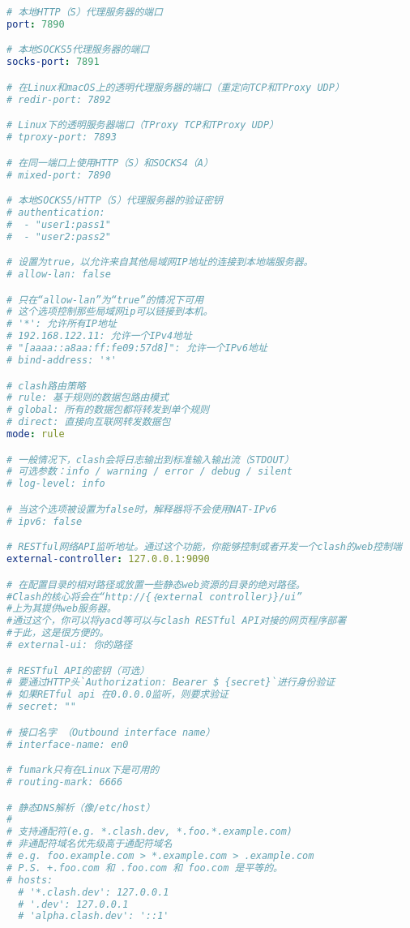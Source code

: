 \begin{lstlisting}[breaklines=true,language=yaml,style=yaml]
# 本地HTTP（S）代理服务器的端口
port: 7890

# 本地SOCKS5代理服务器的端口
socks-port: 7891

# 在Linux和macOS上的透明代理服务器的端口（重定向TCP和TProxy UDP）
# redir-port: 7892

# Linux下的透明服务器端口（TProxy TCP和TProxy UDP）
# tproxy-port: 7893

# 在同一端口上使用HTTP（S）和SOCKS4（A） 
# mixed-port: 7890

# 本地SOCKS5/HTTP（S）代理服务器的验证密钥
# authentication:
#  - "user1:pass1"
#  - "user2:pass2"

# 设置为true，以允许来自其他局域网IP地址的连接到本地端服务器。
# allow-lan: false

# 只在“allow-lan”为“true”的情况下可用
# 这个选项控制那些局域网ip可以链接到本机。
# '*': 允许所有IP地址
# 192.168.122.11: 允许一个IPv4地址
# "[aaaa::a8aa:ff:fe09:57d8]": 允许一个IPv6地址
# bind-address: '*'

# clash路由策略
# rule: 基于规则的数据包路由模式
# global: 所有的数据包都将转发到单个规则
# direct: 直接向互联网转发数据包
mode: rule

# 一般情况下，clash会将日志输出到标准输入输出流（STDOUT）
# 可选参数：info / warning / error / debug / silent
# log-level: info

# 当这个选项被设置为false时，解释器将不会使用NAT-IPv6
# ipv6: false

# RESTful网络API监听地址。通过这个功能，你能够控制或者开发一个clash的web控制端
external-controller: 127.0.0.1:9090

# 在配置目录的相对路径或放置一些静态web资源的目录的绝对路径。
#Clash的核心将会在“http://{｛external controller｝}/ui”
#上为其提供web服务器。
#通过这个，你可以将yacd等可以与clash RESTful API对接的网页程序部署
#于此，这是很方便的。
# external-ui: 你的路径

# RESTful API的密钥（可选） 
# 要通过HTTP头`Authorization: Bearer $ {secret}`进行身份验证 
# 如果RETful api 在0.0.0.0监听，则要求验证
# secret: ""

# 接口名字 （Outbound interface name）
# interface-name: en0

# fumark只有在Linux下是可用的
# routing-mark: 6666

# 静态DNS解析（像/etc/host） 
#
# 支持通配符(e.g. *.clash.dev, *.foo.*.example.com)
# 非通配符域名优先级高于通配符域名
# e.g. foo.example.com > *.example.com > .example.com
# P.S. +.foo.com 和 .foo.com 和 foo.com 是平等的。
# hosts:
  # '*.clash.dev': 127.0.0.1
  # '.dev': 127.0.0.1
  # 'alpha.clash.dev': '::1'


\end{lstlisting}

